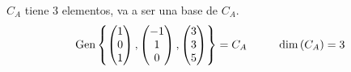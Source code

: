\begin{mathcase}{\(C_A\)}
        tiene 3 elementos, va a ser una base de \(C_A\).
        \[
            \text{Gen} \left\{ 
                \begin{pmatrix}
                    1 \\ 0 \\ 1
                \end{pmatrix},
                \begin{pmatrix}
                    -1 \\ 1 \\ 0
                \end{pmatrix},
                \begin{pmatrix}
                    3 \\ 3 \\ 5
                \end{pmatrix}
             \right\}
            =
            C_A
            \hspace{1cm}
            \text{dim} \left( C_A \right) = 3
        \]
    \end{mathcase}
